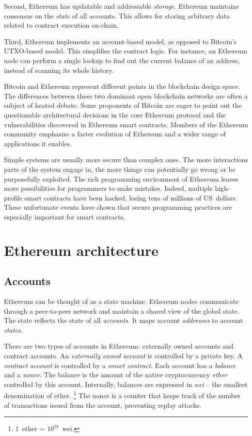 Second, Ethereum has updatable and addressable \textit{storage}.
Ethereum maintains consensus on the \textit{state} of all accounts.
This allows for storing arbitrary data related to contract execution on-chain.

Third, Ethereum implements an account-based model, as opposed to Bitcoin's UTXO-based model.
This simplifies the contract logic.
For instance, an Ethereum node can perform a single lookup to find out the current balance of an address, instead of scanning its whole history.

Bitcoin and Ethereum represent different points in the blockchain design space.
The differences between these two dominant open blockchain networks are often a subject of heated debate.
Some proponents of Bitcoin are eager to point out the questionable architectural decisions in the core Ethereum protocol and the vulnerabilities discovered in Ethereum smart contracts.
Members of the Ethereum community emphasize a faster evolution of Ethereum and a wider range of applications it enables.

Simple systems are usually more secure than complex ones.
The more interactions parts of the system engage in, the more things can potentially go wrong or be purposefully exploited.
The rich programming environment of Ethereum leaves more possibilities for programmers to make mistakes.
Indeed, multiple high-profile smart contracts have been hacked, losing tens of millions of US~dollars.
These unfortunate events have shown that secure programming practices are especially important for smart contracts.


\section{Ethereum architecture}

\subsection{Accounts}

Ethereum can be thought of as a state machine.
Ethereum nodes communicate through a peer-to-peer network and maintain a shared view of the global state.
The state reflects the state of all \textit{accounts}.
It maps account \textit{addresses} to account \textit{states}.

There are two types of accounts in Ethereum: externally owned accounts and contract accounts.
An \textit{externally owned account} is controlled by a private key.
A \textit{contract account} is controlled by a \textit{smart contract}.
Each account has a \textit{balance} and a \textit{nonce}.
The balance is the amount of the native cryptocurrency \textit{ether} controlled by this account.
Internally, balances are expressed in \textit{wei} -- the smallest denomination of ether.
\footnote{$1$~ether = $10^{18}$~wei.}
The nonce is a counter that keeps track of the number of transactions issued from the account, preventing replay attacks.

